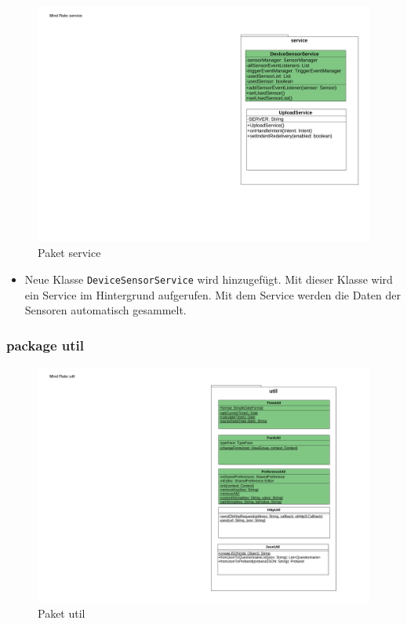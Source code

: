 \documentclass[a4paper]{scrreprt}
\begin{document}
                    \begin{figure}[H]
                        \centering
                        \includegraphics[scale = 1.0]{Service.pdf}
                        \caption{Paket service}
                    \end{figure}
                    \par
                    \begin{itemize}
                           \item Neue Klasse \texttt{DeviceSensorService} wird hinzugefügt. Mit dieser Klasse wird ein Service im Hintergrund aufgerufen. Mit dem Service werden die Daten der Sensoren automatisch gesammelt.
                    \end{itemize}
                \subsubsection{package util}

                    \begin{figure}[H]
                        \centering
                        \includegraphics[scale = 0.9]{util.pdf}
                        \caption{Paket util}
                    \end{figure}
\end{document}
